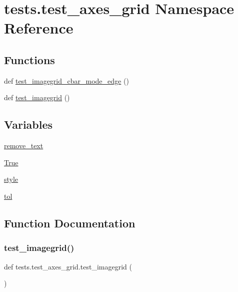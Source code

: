 \hypertarget{namespacetests_1_1test__axes__grid}{}\section{tests.\+test\+\_\+axes\+\_\+grid Namespace Reference}
\label{namespacetests_1_1test__axes__grid}
\subsection*{Functions}
\begin{DoxyCompactItemize}
\item 
def \hyperlink{namespacetests_1_1test__axes__grid_a1bf99f7e4dba382b78c5a6b40ba6ff15}{test\+\_\+imagegrid\+\_\+cbar\+\_\+mode\+\_\+edge} ()
\item 
def \hyperlink{namespacetests_1_1test__axes__grid_a60f6cebd4e6ee8a65591d9a44012ba3c}{test\+\_\+imagegrid} ()
\end{DoxyCompactItemize}
\subsection*{Variables}
\begin{DoxyCompactItemize}
\item 
\hyperlink{namespacetests_1_1test__axes__grid_ab9f242151bfc98b52e3f5b173a93fda0}{remove\+\_\+text}
\item 
\hyperlink{namespacetests_1_1test__axes__grid_a704a1dff529d372462b81e029df3756b}{True}
\item 
\hyperlink{namespacetests_1_1test__axes__grid_a82e8b5ea738ca2f11fe51e4422f637a9}{style}
\item 
\hyperlink{namespacetests_1_1test__axes__grid_a5d3769b8fec11c3db57f9969a1ed914d}{tol}
\end{DoxyCompactItemize}


\subsection{Function Documentation}
\mbox{\label{namespacetests_1_1test__axes__grid_a60f6cebd4e6ee8a65591d9a44012ba3c}} 
\subsubsection{\texorpdfstring{test\+\_\+imagegrid()}{test\_imagegrid()}}
{\footnotesize\ttfamily def tests.\+test\+\_\+axes\+\_\+grid.\+test\+\_\+imagegrid (\begin{DoxyParamCaption}{ }\end{DoxyParamCaption})}

